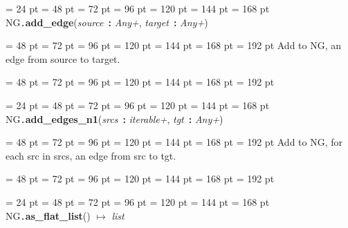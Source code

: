 {{\par \noindent  \leftskip = 24 pt  \leftmargini = 48 pt  \leftmarginii = 72 pt  \leftmarginiii = 96 pt  \leftmarginiv = 120 pt  \leftmarginv = 144 pt  \leftmarginvi = 168 pt NG{\tt .\/}{\bf {\large {\bf add{\_}edge\/}}\/}({\em source\/}~{\bf :}  {\em Any+\/}, {\em target\/}~{\bf :}  {\em Any+\/}){\par \noindent
{\par \noindent  \leftskip = 48 pt  \leftmargini = 72 pt  \leftmarginii = 96 pt  \leftmarginiii = 120 pt  \leftmarginiv = 144 pt  \leftmarginv = 168 pt  \leftmarginvi = 192 pt  Add to NG, an edge from source to target.\par}
{\par \noindent  \leftskip = 48 pt  \leftmargini = 72 pt  \leftmarginii = 96 pt  \leftmarginiii = 120 pt  \leftmarginiv = 144 pt  \leftmarginv = 168 pt  \leftmarginvi = 192 pt {\par \noindent
\par}
\par}
\par}
\par}
{\par \noindent  \leftskip = 24 pt  \leftmargini = 48 pt  \leftmarginii = 72 pt  \leftmarginiii = 96 pt  \leftmarginiv = 120 pt  \leftmarginv = 144 pt  \leftmarginvi = 168 pt NG{\tt .\/}{\bf {\large {\bf add{\_}edges{\_}n1\/}}\/}({\em srcs\/}~{\bf :}  {\em iterable+\/}, {\em tgt\/}~{\bf :}  {\em Any+\/}){\par \noindent
{\par \noindent  \leftskip = 48 pt  \leftmargini = 72 pt  \leftmarginii = 96 pt  \leftmarginiii = 120 pt  \leftmarginiv = 144 pt  \leftmarginv = 168 pt  \leftmarginvi = 192 pt  Add to NG, for each src in srcs, an edge from src to tgt.\par}
{\par \noindent  \leftskip = 48 pt  \leftmargini = 72 pt  \leftmarginii = 96 pt  \leftmarginiii = 120 pt  \leftmarginiv = 144 pt  \leftmarginv = 168 pt  \leftmarginvi = 192 pt {\par \noindent
\par}
\par}
\par}
\par}
{\par \noindent  \leftskip = 24 pt  \leftmargini = 48 pt  \leftmarginii = 72 pt  \leftmarginiii = 96 pt  \leftmarginiv = 120 pt  \leftmarginv = 144 pt  \leftmarginvi = 168 pt NG{\tt .\/}{\bf {\large {\bf as{\_}flat{\_}list\/}}\/}() \(\mapsto \)  {\em list\/}{\par \noindent
}}}
